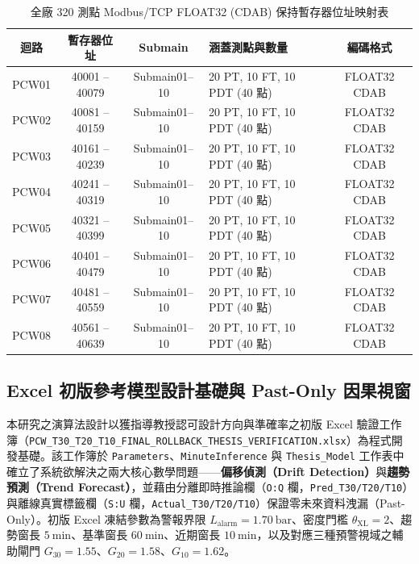 \documentclass[fontset=none, a4paper, 12pt]{ctexart}
\begin{document}
\begin{doublespace}
\begin{table}[H]
\centering
\caption{全廠 320 測點 Modbus/TCP FLOAT32 (CDAB) 保持暫存器位址映射表}
\label{tab:modbus_map_v2}
\footnotesize
\renewcommand{\arraystretch}{1.15}
\setlength{\tabcolsep}{4pt}
\begin{tabularx}{\textwidth}{cccXc}
\toprule
\textbf{迴路} & \textbf{暫存器位址} & \textbf{Submain} & \textbf{涵蓋測點與數量} & \textbf{編碼格式} \\
\midrule
PCW01 & 40001 -- 40079 & Submain01--10 & 20 PT, 10 FT, 10 PDT (40 點) & FLOAT32 CDAB \\
PCW02 & 40081 -- 40159 & Submain01--10 & 20 PT, 10 FT, 10 PDT (40 點) & FLOAT32 CDAB \\
PCW03 & 40161 -- 40239 & Submain01--10 & 20 PT, 10 FT, 10 PDT (40 點) & FLOAT32 CDAB \\
PCW04 & 40241 -- 40319 & Submain01--10 & 20 PT, 10 FT, 10 PDT (40 點) & FLOAT32 CDAB \\
PCW05 & 40321 -- 40399 & Submain01--10 & 20 PT, 10 FT, 10 PDT (40 點) & FLOAT32 CDAB \\
PCW06 & 40401 -- 40479 & Submain01--10 & 20 PT, 10 FT, 10 PDT (40 點) & FLOAT32 CDAB \\
PCW07 & 40481 -- 40559 & Submain01--10 & 20 PT, 10 FT, 10 PDT (40 點) & FLOAT32 CDAB \\
PCW08 & 40561 -- 40639 & Submain01--10 & 20 PT, 10 FT, 10 PDT (40 點) & FLOAT32 CDAB \\
\bottomrule
\end{tabularx}
\end{table}

\subsection{Excel 初版參考模型設計基礎與 Past-Only 因果視窗}
本研究之演算法設計以獲指導教授認可設計方向與準確率之初版 Excel 驗證工作簿（\texttt{PCW\_T30\_T20\_T10\_FINAL\_ROLLBACK\_THESIS\_VERIFICATION.xlsx}）為程式開發基礎。該工作簿於 \texttt{Parameters}、\texttt{MinuteInference} 與 \texttt{Thesis\_Model} 工作表中確立了系統欲解決之兩大核心數學問題——\textbf{偏移偵測（Drift Detection）}與\textbf{趨勢預測（Trend Forecast）}，並藉由分離即時推論欄（\texttt{O:Q} 欄，\texttt{Pred\_T30/T20/T10}）與離線真實標籤欄（\texttt{S:U} 欄，\texttt{Actual\_T30/T20/T10}）保證零未來資料洩漏（Past-Only）。初版 Excel 凍結參數為警報界限 $L_{\mathrm{alarm}} = 1.70\ \mathrm{bar}$、密度門檻 $\theta_{\mathrm{XL}} = 2$、趨勢窗長 $5\ \mathrm{min}$、基準窗長 $60\ \mathrm{min}$、近期窗長 $10\ \mathrm{min}$，以及對應三種預警視域之輔助閘門 $G_{30} = 1.55$、$G_{20} = 1.58$、$G_{10} = 1.62$。


\end{doublespace}
\end{document}
